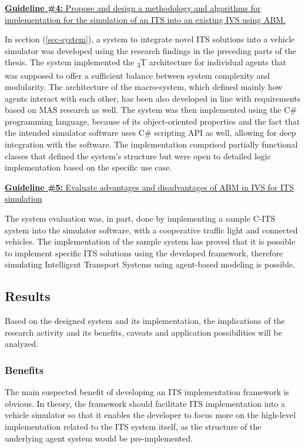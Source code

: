 \documentclass[main.tex]{subfiles}
\begin{document}
\ul{\textbf{Guideline \#4:} Propose and design a methodology and algorithms for implementation for the 
simulation of an ITS into an existing IVS using ABM.}

In section (\ref{sec-system}), a system to integrate novel ITS solutions into a vehicle simulator was developed using the research findings in the 
preceding parts of the thesis. The system implemented the \textsubscript{3}T architecture for individual agents that was supposed 
to offer a sufficient balance between system complexity and modularity. The architecture of the macro-system, which defined mainly 
how agents interact with each other, has been also developed in line with requirements based on MAS research as well. The 
system was then implemented using the C\# programming language, because of its object-oriented properties and the fact that 
the intended simulator software uses C\# scripting API as well, allowing for deep integration with the software. The implementation comprised partially functional classes that 
defined the system's structure but were open to detailed logic implementation based on the specific use case. 

\ul{\textbf{Guideline \#5:} Evaluate advantages and disadvantages of ABM in IVS for ITS simulation}

The system evaluation was, in part, done by implementing a sample C-ITS system into the simulator software, with a cooperative 
traffic light and connected vehicles. The implementation of the sample system has proved that it is possible to implement specific 
ITS solutions using the developed framework, therefore simulating Intelligent Transport Systems using agent-based modeling is 
possible.

\subsection{Results}

Based on the designed system and its implementation, the implications of the research activity and its benefits, caveats and application 
possibilities will be analyzed. 

\subsubsection{Benefits}

The main suspected benefit of developing an ITS implementation framework is obvious. In theory,
the framework should facilitate ITS implementation into a vehicle simulator so that it enables
the developer to focus more on the high-level implementation related to the ITS system itself,
as the structure of the underlying agent system would be pre-implemented. 
\end{document}
